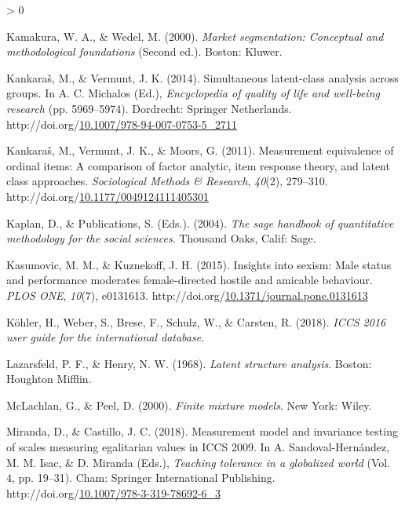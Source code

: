 \documentclass[12pt,a4paper,oneside]{reedthesis}
\newlength{\cslhangindent}
\newenvironment{CSLReferences}[2] %
 {%
  \setlength{\parindent}{0pt}
  \ifodd #1 \everypar{\setlength{\hangindent}{\cslhangindent}}\ignorespaces\fi
  \ifnum #2 > 0
  \setlength{\parskip}{#2\baselineskip}
  \fi
 }%
 {}
\begin{document}
\begin{CSLReferences}{1}{0}
\leavevmode\hypertarget{ref-kamakura_market_2000}{}%
Kamakura, W. A., \& Wedel, M. (2000). \emph{Market segmentation: Conceptual and methodological foundations} (Second ed.). Boston: Kluwer.

\leavevmode\hypertarget{ref-michalos_simultaneous_2014}{}%
Kankaraš, M., \& Vermunt, J. K. (2014). Simultaneous latent-class analysis across groups. In A. C. Michalos (Ed.), \emph{Encyclopedia of quality of life and well-being research} (pp. 5969--5974). Dordrecht: Springer Netherlands. http://doi.org/\href{https://doi.org/10.1007/978-94-007-0753-5_2711}{10.1007/978-94-007-0753-5\_2711}

\leavevmode\hypertarget{ref-kankaras_measurement_2011}{}%
Kankaraš, M., Vermunt, J. K., \& Moors, G. (2011). Measurement equivalence of ordinal items: A comparison of factor analytic, item response theory, and latent class approaches. \emph{Sociological Methods \& Research}, \emph{40}(2), 279--310. http://doi.org/\href{https://doi.org/10.1177/0049124111405301}{10.1177/0049124111405301}

\leavevmode\hypertarget{ref-kaplan_sage_2004}{}%
Kaplan, D., \& Publications, S. (Eds.). (2004). \emph{The sage handbook of quantitative methodology for the social sciences}. Thousand Oaks, Calif: Sage.

\leavevmode\hypertarget{ref-kasumovic_insights_2015}{}%
Kasumovic, M. M., \& Kuznekoff, J. H. (2015). Insights into sexism: Male status and performance moderates female-directed hostile and amicable behaviour. \emph{{PLOS} {ONE}}, \emph{10}(7), e0131613. http://doi.org/\href{https://doi.org/10.1371/journal.pone.0131613}{10.1371/journal.pone.0131613}

\leavevmode\hypertarget{ref-kohler_iccs_2018}{}%
Köhler, H., Weber, S., Brese, F., Schulz, W., \& Carsten, R. (2018). \emph{{ICCS} 2016 user guide for the international database}.

\leavevmode\hypertarget{ref-lazarsfeld_latent_1968}{}%
Lazarsfeld, P. F., \& Henry, N. W. (1968). \emph{Latent structure analysis}. Boston: Houghton Mifflin.

\leavevmode\hypertarget{ref-mclachlan_finite_2000}{}%
McLachlan, G., \& Peel, D. (2000). \emph{Finite mixture models}. New York: Wiley.

\leavevmode\hypertarget{ref-miranda_measurement_2018}{}%
Miranda, D., \& Castillo, J. C. (2018). Measurement model and invariance testing of scales measuring egalitarian values in {ICCS} 2009. In A. Sandoval-Hernández, M. M. Isac, \& D. Miranda (Eds.), \emph{Teaching tolerance in a globalized world} (Vol. 4, pp. 19--31). Cham: Springer International Publishing. http://doi.org/\href{https://doi.org/10.1007/978-3-319-78692-6_3}{10.1007/978-3-319-78692-6\_3}


\end{CSLReferences}
\end{document}
